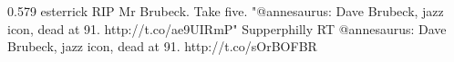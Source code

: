 {0.579}
{\joinNameTweet
{esterrick}
{RIP Mr Brubeck. Take five. "@annesaurus: Dave Brubeck, jazz icon, dead at 91. http://t.co/ae9UIRmP"}}
{\joinNameTweet
{Supperphilly}
{RT @annesaurus: Dave Brubeck, jazz icon, dead at 91. http://t.co/sOrBOFBR}}
%
%
%
%
%
%
%
%
